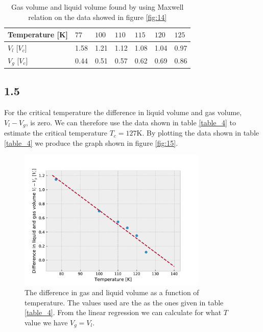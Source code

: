 \documentclass[a4paper,10pt, english]{article}
\begin{document}
\begin{table}[]
\begin{center}
\caption{Gas volume and liquid volume found by using Maxwell relation on the data showed in figure \vref{fig:14}}
\begin{tabular}{@{}lllllll@{}}
\toprule
Temperature {[}K{]} & $77$ & $100$ & $110$ & $115$ & $120$ & $125$ \\ \midrule
$V_l$ {[}$V_c${]}    & 1.58 & 1.21  & 1.12  & 1.08  & 1.04  & 0.97  \\
$V_g$ {[}$V_c${]}    & 0.44 & 0.51  & 0.57  & 0.62  & 0.69  & 0.86  \\ \bottomrule
\end{tabular}
\label{table_4}
\end{center}

\end{table}

\subsection*{1.5}
For the critical temperature the difference in liquid volume and gas volume, $V_l-V_g$, is zero. We can therefore use the data shown in table \vref{table_4} to estimate the critical temperature $T_c=127$K. By plotting the data shown in table \vref{table_4} we produce the graph shown in figure \vref{fig:15}.

\begin{figure}[h!]
  \centering
    \includegraphics[width=0.8\textwidth]{../figures/lin_reg.pdf}
    \caption{The difference in gas and liquid volume as a function of temperature. The values used are the as the ones given in table \vref{table_4}. From the linear regression we can calculate for what $T$ value we have $V_g=V_l$.}
    \label{fig:15}
\end{figure}
\end{document}
